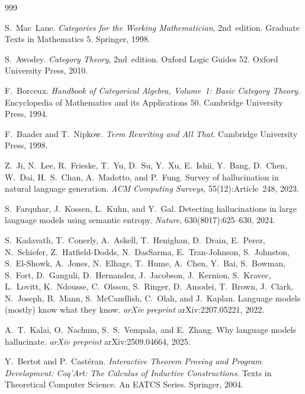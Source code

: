 \begin{thebibliography}{999}


S.~Mac~Lane.
\newblock \emph{Categories for the Working Mathematician}, 2nd~edition.
\newblock Graduate Texts in Mathematics 5. Springer, 1998.

S.~Awodey.
\newblock \emph{Category Theory}, 2nd~edition.
\newblock Oxford Logic Guides 52. Oxford University Press, 2010.

F.~Borceux.
\newblock \emph{Handbook of Categorical Algebra, Volume~1: Basic Category Theory}.
\newblock Encyclopedia of Mathematics and its Applications 50. Cambridge University Press, 1994.

F.~Baader and T.~Nipkow.
\newblock \emph{Term Rewriting and All That}.
\newblock Cambridge University Press, 1998.

Z.~Ji, N.~Lee, R.~Frieske, T.~Yu, D.~Su, Y.~Xu, E.~Ishii, Y.~Bang, D.~Chen, W.~Dai, H.~S.~Chan, A.~Madotto, and P.~Fung.
\newblock Survey of hallucination in natural language generation.
\newblock \emph{ACM Computing Surveys}, 55(12):Article~248, 2023.

S.~Farquhar, J.~Kossen, L.~Kuhn, and Y.~Gal.
\newblock Detecting hallucinations in large language models using semantic entropy.
\newblock \emph{Nature}, 630(8017):625--630, 2024.

S.~Kadavath, T.~Conerly, A.~Askell, T.~Henighan, D.~Drain, E.~Perez, N.~Schiefer, Z.~Hatfield-Dodds, N.~DasSarma, E.~Tran-Johnson, S.~Johnston, S.~El-Showk, A.~Jones, N.~Elhage, T.~Hume, A.~Chen, Y.~Bai, S.~Bowman, S.~Fort, D.~Ganguli, D.~Hernandez, J.~Jacobson, J.~Kernion, S.~Kravec, L.~Lovitt, K.~Ndousse, C.~Olsson, S.~Ringer, D.~Amodei, T.~Brown, J.~Clark, N.~Joseph, B.~Mann, S.~McCandlish, C.~Olah, and J.~Kaplan.
\newblock Language models (mostly) know what they know.
\newblock \emph{arXiv preprint} arXiv:2207.05221, 2022.

A.~T.~Kalai, O.~Nachum, S.~S.~Vempala, and E.~Zhang.
\newblock Why language models hallucinate.
\newblock \emph{arXiv preprint} arXiv:2509.04664, 2025.

Y.~Bertot and P.~Cast\'eran.
\newblock \emph{Interactive Theorem Proving and Program Development: Coq'Art: The Calculus of Inductive Constructions}.
\newblock Texts in Theoretical Computer Science. An EATCS Series. Springer, 2004.


\end{thebibliography}
